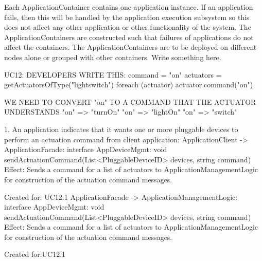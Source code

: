         Each ApplicationContainer contains one application instance. If an application fails,
        then this will be handled by the application execution subsystem so this
        does not affect any other application or other functionality of the system.
        The ApplicationContainers are constructed such that failures of applications
        do not affect the containers. The ApplicationContainers are to be deployed
        on different nodes alone or grouped with other containers. Write something here.




        UC12:
            DEVELOPERS WRITE THIS: command = "on"
            actuators = getActuatorsOfType("lightswitch")
            foreach (actuator) {
                actuator.command("on")
            }

            WE NEED TO CONVERT "on" TO A COMMAND THAT THE ACTUATOR UNDERSTANDS
            "on" => "turnOn"
            "on" => "lightOn"
            "on" => "switch"

            1. An application indicates that it wants one or more pluggable devices to perform an actuation command
                from client application:
                    ApplicationClient -> ApplicationFacade:           interface AppDeviceMgmt: void sendActuationCommand(List<PluggableDeviceID> devices, string command)
                        Effect: Sends a command for a list of actuators to ApplicationManagementLogic for construction of the actuation command messages.
                        \item Created for: UC12.1
                    ApplicationFacade -> ApplicationManagementLogic:  interface AppDeviceMgmt:  void sendActuationCommand(List<PluggableDeviceID> devices, string command)
                        Effect: Sends a command for a list of actuators to ApplicationManagementLogic for construction of the actuation command messages.
                        \item Created for:UC12.1

